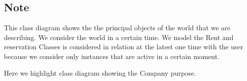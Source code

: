 \documentclass[english]{article}
\begin{document}
	\subsection*{Note}
		This class diagram shows the the principal objects of the world that we are describing. We consider the world in a certain time. We model the Rent and reservation Classes is considered in relation at the latest one time with the user because we consider only instances that are active in a certain moment. 
		
	\clearpage Here we highlight class diagram showing the Company purpose.
		
	\noindent
		\\	
	\noindent
		\\	
\end{document}
